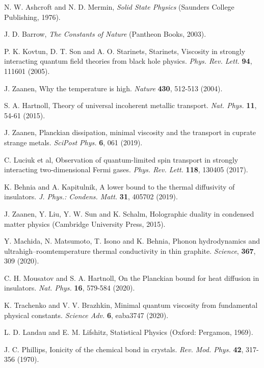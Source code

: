 \documentclass[aps,prl,groupedaddress,fleqn,twocolumn,10pt]{revtex4-1}
\begin{document}
\begin{thebibliography}{99}

 N. W. Ashcroft and N. D. Mermin, {\it Solid State Physics} (Saunders College Publishing, 1976).

 J. D. Barrow, {\it The Constants of Nature} (Pantheon Books, 2003).

 P. K. Kovtun, D. T. Son and A. O. Starinets, Starinets, Viscosity in strongly interacting quantum field
theories from black hole physics. {\it Phys. Rev. Lett.} {\bf 94}, 111601 (2005).

 J. Zaanen, Why the temperature is high. {\it Nature} {\bf 430}, 512-513 (2004).

 S. A. Hartnoll, Theory of universal incoherent metallic transport. {\it Nat. Phys.} {\bf 11}, 54-61 (2015).

 J. Zaanen, Planckian dissipation, minimal viscosity and the transport in cuprate strange
metals. {\it SciPost Phys.} {\bf 6}, 061 (2019).

 C. Luciuk et al, Observation of quantum-limited spin transport in strongly interacting two-dimensional
Fermi gases. {\it Phys. Rev. Lett.} {\bf 118}, 130405 (2017).

 K. Behnia and A. Kapitulnik, A lower bound to the thermal diffusivity
of insulators. {\it J. Phys.: Condens. Matt.} {\bf 31}, 405702 (2019).

 J. Zaanen, Y. Liu, Y. W. Sun and K. Schalm, Holographic duality in condensed matter physics (Cambridge University Press, 2015).

 Y. Machida, N. Matsumoto, T. Isono and K. Behnia, Phonon hydrodynamics and ultrahigh–roomtemperature
thermal conductivity in thin graphite. {\it Science}, {\bf 367}, 309 (2020).

 C. H. Mousatov and S. A. Hartnoll, On the Planckian bound for heat diffusion in insulators. {\it Nat. Phys.} {\bf 16}, 579-584 (2020).

 K. Trachenko and V. V. Brazhkin, Minimal quantum viscosity from fundamental physical constants. {\it Science Adv.} {\bf 6}, eaba3747 (2020).

 L. D. Landau and E. M. Lifshitz, Statistical Physics
(Oxford: Pergamon, 1969).

 J. C. Phillips, Ionicity of the chemical bond in crystals. {\it Rev. Mod. Phys.} {\bf 42}, 317-356 (1970).


\end{thebibliography}
\end{document}
